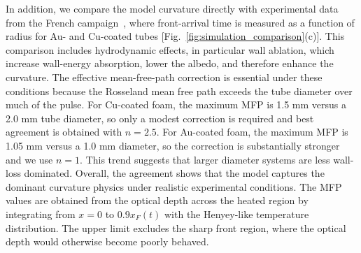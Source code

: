 \documentclass[prl, twocolumn, superscriptaddress, amsmath, amssymb, reprint]{revtex4-2}
\begin{document}
In addition, we compare the model curvature directly with experimental data from the French campaign~\cite{Courtois2024}, where front-arrival time is measured as a function of radius for Au- and Cu-coated tubes [Fig.~\ref{fig:simulation_comparison}(c)]. This comparison includes hydrodynamic effects, in particular wall ablation, which increase wall-energy absorption, lower the albedo, and therefore enhance the curvature. The effective mean-free-path correction is essential under these conditions because the Rosseland mean free path exceeds the tube diameter over much of the pulse. For Cu-coated foam, the maximum MFP is 1.5 mm versus a 2.0 mm tube diameter, so only a modest correction is required and best agreement is obtained with $n=2.5$. For Au-coated foam, the maximum MFP is 1.05 mm versus a 1.0 mm diameter, so the correction is substantially stronger and we use $n=1$. This trend suggests that larger diameter systems are less wall-loss dominated. Overall, the agreement shows that the model captures the dominant curvature physics under realistic experimental conditions. The MFP values are obtained from the optical depth across the heated region by integrating from $x=0$ to $0.9x_F(t)$ with the Henyey-like temperature distribution. The upper limit excludes the sharp front region, where the optical depth would otherwise become poorly behaved.
\end{document}
